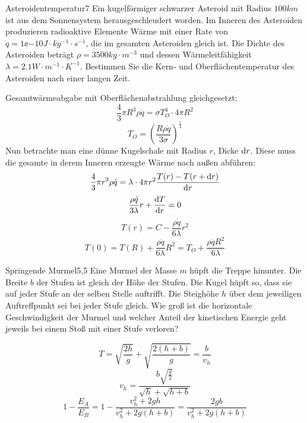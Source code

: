 \begin{problem}{Asteroidentemperatur}{7}
Ein kugelförmiger schwarzer Asteroid mit Radius $100 \unit{km}$ ist aus dem Sonnensystem herausgeschleudert worden. Im Inneren des Asteroiden produzieren radioaktive Elemente Wärme mit einer Rate von $\dot{q}=1 \ee{-10} \unit{J\cdot kg^{-1} \cdot s^{-1}}$, die im gesamten Asteroiden gleich ist. Die Dichte des Asteroiden beträgt $\rho=3500 \unit{kg \cdot m^{-3}}$ und dessen Wärmeleitfähigkeit $\lambda=2.1 \unit{W \cdot m^{-1} \cdot K^{-1}}$. Bestimmen Sie die Kern- und Oberflächentemperatur des Asteroiden nach einer langen Zeit.
\begin{solution}
Gesamtwärmeabgabe mit Oberflächenabstrahlung gleichgesetzt:
\[
\frac43 \pi R^3 \rho \dot{q}=\sigma T_O^4 \cdot 4\pi R^2
\]
\[
T_O=\left( \frac{R\rho \dot{q}}{3\sigma} \right)^\frac14
\]
Nun betrachte man eine dünne Kugelschale mit Radius $r$, Dicke $\mathrm{d} r$. Diese muss die gesamte in derem Inneren erzeugte Wärme nach außen abführen:
\[
\frac43 \pi r^3 \rho \dot{q}=\lambda \cdot 4\pi r^2 \frac{T(r)-T(r+\mathrm{d} r)}{\mathrm{d} r}
\]
\[
\frac{\rho \dot{q}}{3 \lambda}r+\frac{\mathrm{d} T}{\mathrm{d} r}=0
\]
\[
T(r)=C-\frac{\rho \dot{q}}{6 \lambda} r^2
\]
\[
T(0)=T(R)+\frac{\rho \dot{q}}{6 \lambda}R^2=T_O+\frac{\rho \dot{q} R^2}{6 \lambda}
\]
\end{solution}
\end{problem}

\begin{problem}{Springende Murmel}{5,5}
Eine Murmel der Masse $m$ hüpft die Treppe hinunter. Die Breite $b$ der Stufen ist gleich der Höhe der Stufen. Die Kugel hüpft so, dass sie auf jeder Stufe an der selben Stelle auftrifft. Die Steighöhe $h$ über dem jeweiligen Auftreffpunkt sei bei jeder Stufe gleich. Wie groß ist die horizontale Geschwindigkeit der Murmel und welcher Anteil der kinetischen Energie geht jeweils bei einem Stoß mit einer Stufe verloren?
\begin{solution}
\[
T=\sqrt{\frac{2h}{g}}+\sqrt{\frac{2(h+b)}{g}}=\frac{b}{v_h}
\]
\[
v_h=\frac{b\sqrt{\frac{g}{2}}}{\sqrt{h}+\sqrt{h+b}}
\]
\[
1-\frac{E_A}{E_B}=1-\frac{v_h^2+2gh}{v_h^2+2g(h+b)}=\frac{2gb}{v_h^2+2g(h+b)}
\]
\end{solution}
\end{problem}

